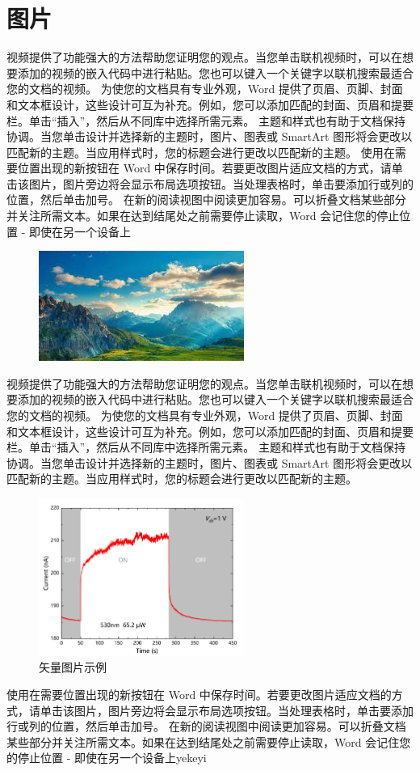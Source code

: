 \section{图片}
视频提供了功能强大的方法帮助您证明您的观点。当您单击联机视频时，可以在想要添加的视频的嵌入代码中进行粘贴。您也可以键入一个关键字以联机搜索最适合您的文档的视频。
为使您的文档具有专业外观，Word 提供了页眉、页脚、封面和文本框设计，这些设计可互为补充。例如，您可以添加匹配的封面、页眉和提要栏。单击“插入”，然后从不同库中选择所需元素。
主题和样式也有助于文档保持协调。当您单击设计并选择新的主题时，图片、图表或 SmartArt 图形将会更改以匹配新的主题。当应用样式时，您的标题会进行更改以匹配新的主题。
使用在需要位置出现的新按钮在 Word 中保存时间。若要更改图片适应文档的方式，请单击该图片，图片旁边将会显示布局选项按钮。当处理表格时，单击要添加行或列的位置，然后单击加号。
在新的阅读视图中阅读更加容易。可以折叠文档某些部分并关注所需文本。如果在达到结尾处之前需要停止读取，Word 会记住您的停止位置 - 即使在另一个设备上
\begin{figure}[H]
	\centering
	\includegraphics[width=0.6\textwidth]{figure/chapter1/Omni.jpg}
	\label{picexam}
\end{figure}
视频提供了功能强大的方法帮助您证明您的观点。当您单击联机视频时，可以在想要添加的视频的嵌入代码中进行粘贴。您也可以键入一个关键字以联机搜索最适合您的文档的视频。
为使您的文档具有专业外观，Word 提供了页眉、页脚、封面和文本框设计，这些设计可互为补充。例如，您可以添加匹配的封面、页眉和提要栏。单击“插入”，然后从不同库中选择所需元素。
主题和样式也有助于文档保持协调。当您单击设计并选择新的主题时，图片、图表或 SmartArt 图形将会更改以匹配新的主题。当应用样式时，您的标题会进行更改以匹配新的主题。
\begin{figure}[H]
	\centering
	\includegraphics[width=0.6\textwidth]{figure/chapter1/Graph3.pdf}
	\caption{矢量图片示例 }	
	\label{pdfpic}
\end{figure}
使用在需要位置出现的新按钮在 Word 中保存时间。若要更改图片适应文档的方式，请单击该图片，图片旁边将会显示布局选项按钮。当处理表格时，单击要添加行或列的位置，然后单击加号。
在新的阅读视图中阅读更加容易。可以折叠文档某些部分并关注所需文本。如果在达到结尾处之前需要停止读取，Word 会记住您的停止位置 - 即使在另一个设备上yekeyi

